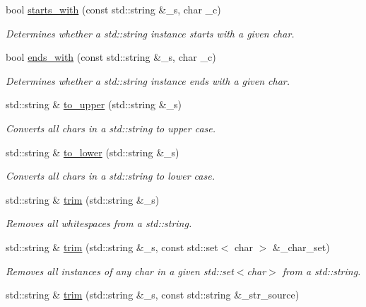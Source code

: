 \begin{DoxyCompactItemize}
bool \hyperlink{namespacecrsc_a7181d0a49fff497ab91db955e81c7777}{starts\+\_\+with} (const std\+::string \&\+\_\+s, char \+\_\+c)
\begin{DoxyCompactList}\small\item\em Determines whether a std\+::string instance starts with a given char. \end{DoxyCompactList}\item 
bool \hyperlink{namespacecrsc_a0f5bcef6c47624168d930133724dc466}{ends\+\_\+with} (const std\+::string \&\+\_\+s, char \+\_\+c)
\begin{DoxyCompactList}\small\item\em Determines whether a std\+::string instance ends with a given char. \end{DoxyCompactList}\item 
std\+::string \& \hyperlink{namespacecrsc_ae0c591013c6cc6f3356566d9df09fd1e}{to\+\_\+upper} (std\+::string \&\+\_\+s)
\begin{DoxyCompactList}\small\item\em Converts all char\textquotesingle{}s in a std\+::string to upper case. \end{DoxyCompactList}\item 
std\+::string \& \hyperlink{namespacecrsc_a4cf3170f561206a1d633bb183cbf0844}{to\+\_\+lower} (std\+::string \&\+\_\+s)
\begin{DoxyCompactList}\small\item\em Converts all char\textquotesingle{}s in a std\+::string to lower case. \end{DoxyCompactList}\item 
std\+::string \& \hyperlink{namespacecrsc_a02acdf61ec9a965849b6cf05ea01a242}{trim} (std\+::string \&\+\_\+s)
\begin{DoxyCompactList}\small\item\em Removes all whitespaces from a std\+::string. \end{DoxyCompactList}\item 
std\+::string \& \hyperlink{namespacecrsc_a96bc639baa486618114c5f01774ef552}{trim} (std\+::string \&\+\_\+s, const std\+::set$<$ char $>$ \&\+\_\+char\+\_\+set)
\begin{DoxyCompactList}\small\item\em Removes all instances of any char in a given std\+::set$<$char$>$ from a std\+::string. \end{DoxyCompactList}\item 
std\+::string \& \hyperlink{namespacecrsc_a2c037ba46bb099d936b0ebe840c40c80}{trim} (std\+::string \&\+\_\+s, const std\+::string \&\+\_\+str\+\_\+source)

\end{DoxyCompactItemize}
